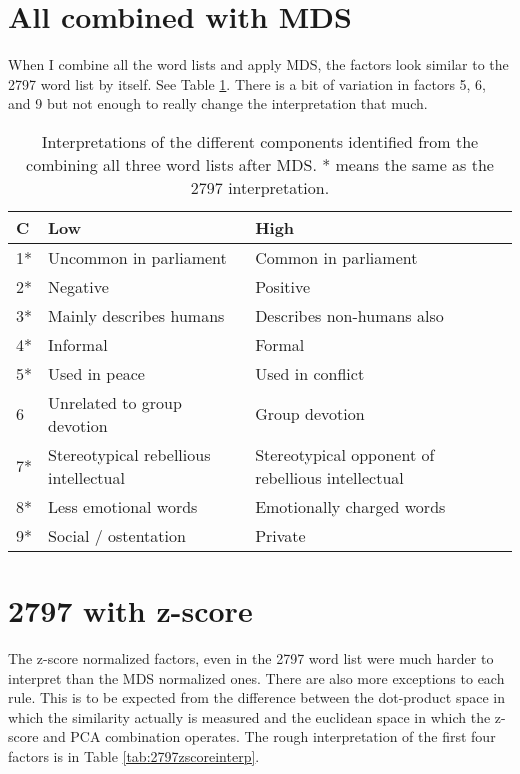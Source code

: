 \section{All combined with MDS}

When I combine all the word lists and apply MDS, the factors look similar to 
the 2797 word list by itself. See Table \ref{tab:2797and438and101mdsinterp}. 
There is a bit of variation in factors 5, 6, and 9 but not enough to really 
change the interpretation that much.

\begin{table}[tbp]
\begin{tabular}{ | l |p{2in}|p{2in}|}
 \hline
 C & Low & High \\
 \hline
 1* & Uncommon in parliament & Common in parliament\\
 2* & Negative & Positive\\
 3* & Mainly describes humans & Describes non-humans also \\
 4* & Informal & Formal \\
 5* & Used in peace & Used in conflict \\
 6 & Unrelated to group devotion & Group devotion \\
 7* & Stereotypical rebellious intellectual & Stereotypical opponent of 
     rebellious intellectual \\
 8* & Less emotional words & Emotionally charged words \\
 9* & Social / ostentation & Private  \\
 \hline
\end{tabular}
 \caption{Interpretations of the different components identified from the combining
 all three word lists after MDS. * means the same as the 2797 interpretation.}
 \label{tab:2797and438and101mdsinterp}
\end{table}


\section{2797 with z-score}

The z-score normalized factors, even in the 2797 word list were much harder to 
interpret than the MDS normalized ones. There are also more exceptions to each 
rule. This is to be expected from the difference between the dot-product 
space in which the similarity actually is measured and the euclidean space in 
which the z-score and PCA combination operates. The rough interpretation of 
the first four factors is in Table \ref{tab:2797zscoreinterp}.


